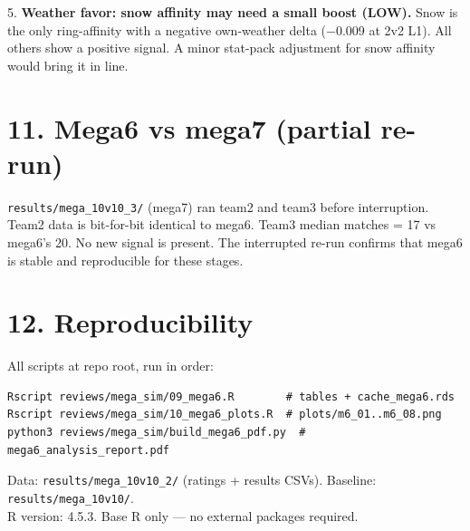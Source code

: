 \documentclass[10pt]{article}
\begin{document}
5. \textbf{Weather favor: snow affinity may need a small boost (LOW).} Snow is the only ring-affinity with a negative own-weather delta (−0.009 at 2v2 L1). All others show a positive signal. A minor stat-pack adjustment for snow affinity would bring it in line.\\


\section*{11. Mega6 vs mega7 (partial re-run)}

\texttt{results/\allowbreak{}mega\_\allowbreak{}10v10\_\allowbreak{}3/\allowbreak{}} (mega7) ran team2 and team3 before interruption. Team2 data is bit-for-bit identical to mega6. Team3 median matches = 17 vs mega6's 20. No new signal is present. The interrupted re-run confirms that mega6 is stable and reproducible for these stages.\\


\section*{12. Reproducibility}

All scripts at repo root, run in order:\\

\begin{lstlisting}
Rscript reviews/mega_sim/09_mega6.R        # tables + cache_mega6.rds
Rscript reviews/mega_sim/10_mega6_plots.R  # plots/m6_01..m6_08.png
python3 reviews/mega_sim/build_mega6_pdf.py  # mega6_analysis_report.pdf
\end{lstlisting}

Data: \texttt{results/\allowbreak{}mega\_\allowbreak{}10v10\_\allowbreak{}2/\allowbreak{}} (ratings + results CSVs). Baseline: \texttt{results/\allowbreak{}mega\_\allowbreak{}10v10/\allowbreak{}}.\\
R version: 4.5.3. Base R only --- no external packages required.\\
\end{document}
